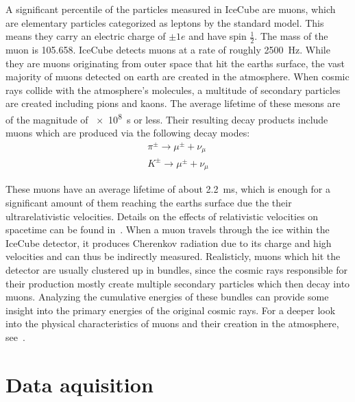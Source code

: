 A significant percentile of the particles measured in IceCube are muons, which are elementary particles categorized as leptons by the standard model.
This means they carry an electric charge of $\pm 1e$ and have spin $\frac{1}{2}$. The mass of the muon is \num{105.658}. IceCube detects
muons at a rate of roughly \SI{2500}{Hz}. While they are muons originating from outer space that hit the earths surface, the vast majority of muons detected
on earth are created in the atmosphere. When cosmic rays collide with the atmosphere's molecules, a multitude of secondary particles are created including 
pions and kaons. The average lifetime of these mesons are of the magnitude of \SI{e8}{s} or less. Their resulting decay products include muons which are 
produced via the following decay modes:\\

\begin{align}
    \pi^\pm \to \mu^\pm + \nu_\mu \\
    K^\pm \to \mu^\pm + \nu_\mu
\end{align}

These muons have an average lifetime of about \SI{2.2}{ms}, which is enough for a significant amount of them reaching the earths surface due the their 
ultrarelativistic velocities. Details on the effects of relativistic velocities on spacetime can be found in~\cite{einstein}. When a muon travels through the ice 
within the IceCube detector, it produces Cherenkov radiation due to its charge and high velocities and 
can thus be indirectly measured. Realisticly, muons which hit the detector are usually clustered up in bundles, since the cosmic rays responsible for their production
mostly create multiple secondary particles which then decay into muons. Analyzing the cumulative energies of these bundles can provide some insight into the primary 
energies of the original cosmic rays. For a deeper look into the physical characteristics of muons and their creation in the atmosphere, see~\cite{einstein}.


\section{Data aquisition}\label{sec:daq}

